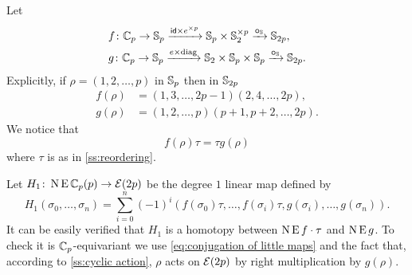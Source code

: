 \sssec

Let
\[
\begin{split}
	&f \colon \mathbb{C}_p \to \mathbb{S}_p \xrightarrow{\mathsf{id} \times e^{\times p}} \mathbb{S}_p \times \mathbb{S}_2^{\times p} \xrightarrow{\bm{\circ}_{\mathbb{S}}} \mathbb{S}_{2p}, \\
	&g \colon \mathbb{C}_p \to \mathbb{S}_p \xrightarrow{e \times \mathrm{diag}} \mathbb{S}_2 \times \mathbb{S}_p \times \mathbb{S}_p \xrightarrow{\bm{\circ}_{\mathbb{S}}} \mathbb{S}_{2p}.
\end{split}
\]
Explicitly, if $\rho = (1,2,\dots,p)$ in $\mathbb{S}_p$ then in $\mathbb{S}_{2p}$
\begin{align*}
	f(\rho) &= (1,3,\dots,2p-1)(2,4,\dots,2p), \\
	g(\rho) &= (1,2,\dots,p)(p+1,p+2,\dots,2p).
\end{align*}
We notice that
\begin{equation}\label{eq:conjugation of little maps}
	f(\rho) \tau = \tau g(\rho)
\end{equation}
where $\tau$ is as in \cref{ss:reordering}.

\sssec

Let $H_1 \colon \operatorname{N}\operatorname{E}\mathbb{C}_p(p) \to \mathcal{E}(2p)$ be the degree $1$ linear map defined by
\[
H_1(\sigma_0,\dots,\sigma_n) =
\sum_{i=0}^n (-1)^i (f(\sigma_0) \tau, \dots, f(\sigma_i) \tau, g(\sigma_i), \dots, g(\sigma_n)).
\]
It can be easily verified that $H_1$ is a homotopy between $\operatorname{N} \operatorname{E} f \cdot \tau$ and $\operatorname{N} \operatorname{E} g$.
To check it is $\mathbb{C}_p$-equivariant we use \cref{eq:conjugation of little maps} and the fact that, according to \cref{ss:cyclic action}, $\rho$ acts on $\mathcal{E}(2p)$ by right multiplication by $g(\rho)$.

